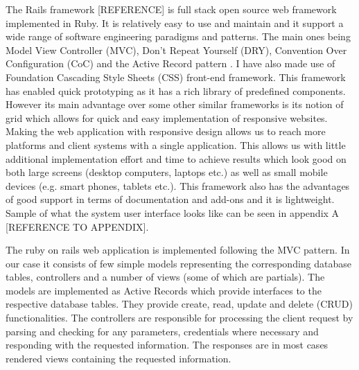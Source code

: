 The Rails framework [REFERENCE] is full stack open source web framework implemented in Ruby. It is relatively easy to use and maintain and it support a wide range of software engineering paradigms and patterns. The main ones being Model View Controller (MVC), Don't Repeat Yourself (DRY), Convention Over Configuration (CoC) and the Active Record pattern \cite{fowler2003patterns}. I have also made use of Foundation Cascading Style Sheets (CSS) front-end framework. This framework has enabled quick prototyping as it has a rich library of predefined components. However its main advantage over some other similar frameworks is its notion of grid which allows for quick and easy implementation of responsive websites. Making the web application with responsive design allows us to reach more platforms and client systems with a single application. This allows us with little additional implementation effort and time to achieve results which look good on both large screens (desktop computers, laptops etc.) as well as small mobile devices (e.g. smart phones, tablets etc.). This framework also has the advantages of good support in terms of documentation and add-ons and it is lightweight. Sample of what the system user interface looks like can be seen in appendix A [REFERENCE TO APPENDIX].

The ruby on rails web application is implemented following the MVC pattern. In our case it consists of few simple models representing the corresponding database tables, controllers and a number of views (some of which are partials). The models are implemented as Active Records which provide interfaces to the respective database tables. They provide create, read, update and delete (CRUD) functionalities. The controllers are responsible for processing the client request by parsing and checking for any parameters, credentials where necessary and responding with the requested information. The responses are in most cases rendered views containing the requested information.


